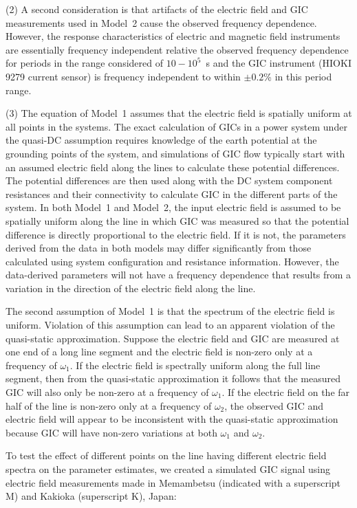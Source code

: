 \documentclass[draft,linenumbers]{agujournal2018}
\begin{document}
(2) A second consideration is that artifacts of the electric field and GIC measurements used in Model~2 cause the observed frequency dependence. However, the response characteristics of electric and magnetic field instruments are essentially frequency independent relative the observed frequency dependence for periods in the range considered of $10-10^{5}$~s \citep{Simpson2005} and the GIC instrument (HIOKI 9279 current sensor) is frequency independent to within $\pm 0.2$\% in this period range.

(3) The equation of Model~1 assumes that the electric field is spatially uniform at all points in the systems. The exact calculation of GICs in a power system under the quasi-DC assumption requires knowledge of the earth potential at the grounding points of the system, and simulations of GIC flow \citep{Albertson1981,Lehtinen1985} typically start with an assumed electric field along the lines to calculate these potential differences. The potential differences are then used along with the DC system component resistances and their connectivity to calculate GIC in the different parts of the system. In both Model~1 and Model~2, the input electric field is assumed to be spatially uniform along the line in which GIC was measured so that the potential difference is directly proportional to the electric field. If it is not, the parameters derived from the data in both models may differ significantly from those calculated using system configuration and resistance information. However, the data-derived parameters will not have a frequency dependence that results from a variation in the direction of the electric field along the line.

The second assumption of Model~1 is that the spectrum of the electric field is uniform. Violation of this assumption can lead to an apparent violation of the quasi-static approximation. Suppose the electric field and GIC are measured at one end of a long line segment and the electric field is non-zero only at a frequency of $\omega_1$. If the electric field is spectrally uniform along the full line segment, then from the quasi-static approximation it follows that the measured GIC will also only be non-zero at a frequency of $\omega_1$. If the electric field on the far half of the line is non-zero only at a frequency of $\omega_2$, the observed GIC and electric field will appear to be inconsistent with the quasi-static approximation because GIC will have non-zero variations at both $\omega_1$ and $\omega_2$.

To test the effect of different points on the line having different electric field spectra on the parameter estimates, we created a simulated GIC signal using electric field measurements made in Memambetsu (indicated with a superscript M) and Kakioka (superscript K), Japan:
\end{document}
